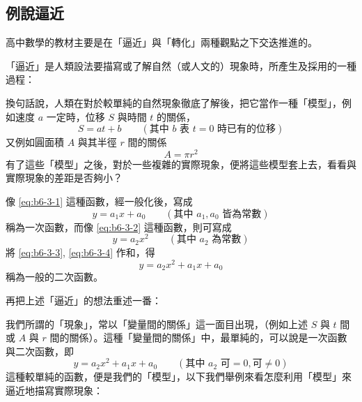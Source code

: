 \subsection{例說逼近}\label{sec:b6-3-1}

高中數學的教材主要是在「逼近」與「轉化」兩種觀點之下交迭推進的。

「逼近」是人類設法要描寫或了解自然（或人文的）現象時，所產生及採用的一種過程：

換句話說，人類在對於較單純的自然現象徹底了解後，把它當作一種「模型」，例如速度 $a$ 一定時，位移 $S$ 與時間 $t$ 的關係，
\begin{equation}
S = at + b \qquad (\text{其中 } b \text{ 表 } t=0 \text{ 時已有的位移}) \label{eq:b6-3-1}
\end{equation}
又例如圓面積 $A$ 與其半徑 $r$ 間的關係
\begin{equation}
A = \pi r^2 \label{eq:b6-3-2}
\end{equation}
有了這些「模型」之後，對於一些複雜的實際現象，便將這些模型套上去，看看與實際現象的差距是否夠小？

像 \eqref{eq:b6-3-1} 這種函數，經一般化後，寫成
\begin{equation}
y = a_1 x + a_0 \qquad (\text{其中 } a_1, a_0 \text{ 皆為常數}) \label{eq:b6-3-3}
\end{equation}
稱為一次函數，而像 \eqref{eq:b6-3-2} 這種函數，則可寫成
\begin{equation}
y = a_2 x^2 \qquad (\text{其中 } a_2 \text{ 為常數}) \label{eq:b6-3-4}
\end{equation}
將 \eqref{eq:b6-3-3}, \eqref{eq:b6-3-4} 作和，得
\begin{equation}
y = a_2 x^2 + a_1 x + a_0 \label{eq:b6-3-5}
\end{equation}
稱為一般的二次函數。

再把上述「逼近」的想法重述一番：

我們所謂的「現象」，常以「變量間的關係」這一面目出現，（例如上述 $S$ 與 $t$ 間或 $A$ 與 $r$ 間的關係）。這種「變量間的關係」中，最單純的，可以說是一次函數與二次函數，即
\[ y = a_2 x^2 + a_1 x + a_0 \qquad (\text{其中 } a_2 \text{ 可}=0, \text{可}\ne 0) \]
這種較單純的函數，便是我們的「模型」，以下我們舉例來看怎麼利用「模型」來逼近地描寫實際現象：

